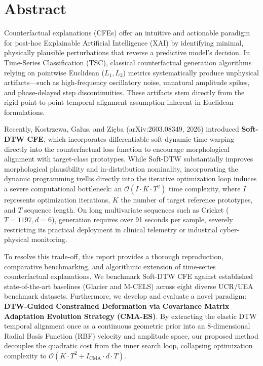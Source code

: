 \documentclass[11pt,a4paper]{report}
\begin{document}
\chapter{Abstract}
Counterfactual explanations (CFEs) offer an intuitive and actionable paradigm for post-hoc Explainable Artificial Intelligence (XAI) by identifying minimal, physically plausible perturbations that reverse a predictive model's decision. In Time-Series Classification (TSC), classical counterfactual generation algorithms relying on pointwise Euclidean ($L_1, L_2$) metrics systematically produce unphysical artifacts—such as high-frequency oscillatory noise, unnatural amplitude spikes, and phase-delayed step discontinuities. These artifacts stem directly from the rigid point-to-point temporal alignment assumption inherent in Euclidean formulations. 

Recently, Kostrzewa, Galus, and Zięba (arXiv:2603.08349, 2026) introduced \textbf{Soft-DTW CFE}, which incorporates differentiable soft dynamic time warping directly into the counterfactual loss function to encourage morphological alignment with target-class prototypes. While Soft-DTW substantially improves morphological plausibility and in-distribution nominality, incorporating the dynamic programming trellis directly into the iterative optimization loop induces a severe computational bottleneck: an $\mathcal{O}(I \cdot K \cdot T^2)$ time complexity, where $I$ represents optimization iterations, $K$ the number of target reference prototypes, and $T$ sequence length. On long multivariate sequences such as Cricket ($T=1197, d=6$), generation requires over 91 seconds per sample, severely restricting its practical deployment in clinical telemetry or industrial cyber-physical monitoring.

To resolve this trade-off, this report provides a thorough reproduction, comparative benchmarking, and algorithmic extension of time-series counterfactual explanations. We benchmark Soft-DTW CFE against established state-of-the-art baselines (Glacier and M-CELS) across eight diverse UCR/UEA benchmark datasets. Furthermore, we develop and evaluate a novel paradigm: \textbf{DTW-Guided Constrained Deformation via Covariance Matrix Adaptation Evolution Strategy (CMA-ES)}. By extracting the elastic DTW temporal alignment once as a continuous geometric prior into an 8-dimensional Radial Basis Function (RBF) velocity and amplitude space, our proposed method decouples the quadratic cost from the inner search loop, collapsing optimization complexity to $\mathcal{O}(K \cdot T^2 + I_{\text{CMA}} \cdot d \cdot T)$.
\end{document}
